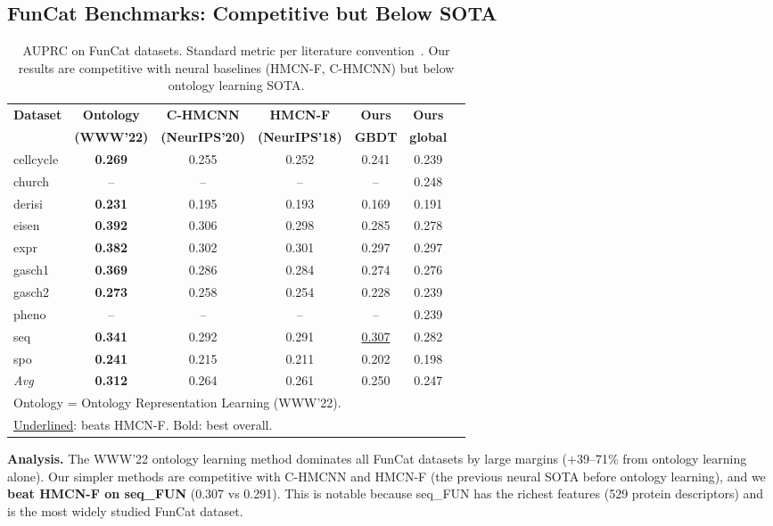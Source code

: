 \documentclass[11pt,a4paper]{article}
\begin{document}
\subsection{FunCat Benchmarks: Competitive but Below SOTA}

\begin{table}[h]
\centering
\caption{AUPRC on FunCat datasets. Standard metric per literature
convention~\cite{www2022ontology}. Our results are competitive with
neural baselines (HMCN-F, C-HMCNN) but below ontology learning SOTA.}
\label{tab:funcat}
\begin{tabular}{lcccccc}
\toprule
\textbf{Dataset} & \textbf{Ontology} & \textbf{C-HMCNN} & \textbf{HMCN-F} &
\textbf{Ours} & \textbf{Ours} & \\
& \textbf{(WWW'22)} & \textbf{(NeurIPS'20)} & \textbf{(NeurIPS'18)} &
\textbf{GBDT} & \textbf{global} & \\
\midrule
cellcycle & \textbf{0.269} & 0.255 & 0.252 & 0.241 & 0.239 \\
church    & -- & -- & -- & -- & 0.248 \\
derisi    & \textbf{0.231} & 0.195 & 0.193 & 0.169 & 0.191 \\
eisen     & \textbf{0.392} & 0.306 & 0.298 & 0.285 & 0.278 \\
expr      & \textbf{0.382} & 0.302 & 0.301 & 0.297 & 0.297 \\
gasch1    & \textbf{0.369} & 0.286 & 0.284 & 0.274 & 0.276 \\
gasch2    & \textbf{0.273} & 0.258 & 0.254 & 0.228 & 0.239 \\
pheno     & -- & -- & -- & -- & 0.239 \\
seq       & \textbf{0.341} & 0.292 & 0.291 & \underline{0.307} & 0.282 \\
spo       & \textbf{0.241} & 0.215 & 0.211 & 0.202 & 0.198 \\
\midrule
\textit{Avg} & \textbf{0.312} & 0.264 & 0.261 & 0.250 & 0.247 \\
\bottomrule
\multicolumn{6}{l}{\small Ontology = Ontology Representation Learning (WWW'22).} \\
\multicolumn{6}{l}{\small \underline{Underlined}: beats HMCN-F. Bold: best overall.} \\
\end{tabular}
\end{table}

\textbf{Analysis.} The WWW'22 ontology learning method dominates all
FunCat datasets by large margins (+39--71\% from ontology learning
alone). Our simpler methods are competitive with C-HMCNN and HMCN-F
(the previous neural SOTA before ontology learning), and we
\textbf{beat HMCN-F on seq\_FUN} (0.307 vs 0.291). This is notable
because seq\_FUN has the richest features (529 protein descriptors)
and is the most widely studied FunCat dataset.
\end{document}
